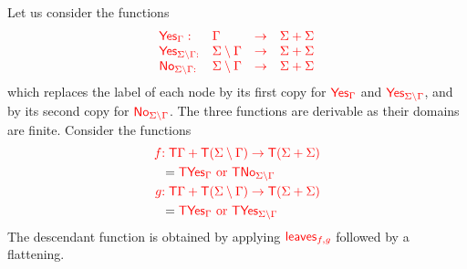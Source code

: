 \begin{example}
Let us consider the functions 
$$\begin{array}{llll}
\ranked{\mathsf{Yes}_\rGamma :} & \rGamma &\ranked{\to} &\ranked{ \rSigma+\rSigma}\\
 \ranked{\mathsf{Yes}_{\ranked{\rSigma\setminus\rGamma}:}}& \ranked{\rSigma\setminus\rGamma}&\ranked{\to} &\ranked{ \rSigma+\rSigma}\\
\ranked{\mathsf{No}_{\ranked{\rSigma\setminus\rGamma}: }}&\ranked{\rSigma\setminus\rGamma} &\ranked{\to}& \ranked{ \rSigma+\rSigma}
\end{array}$$
which replaces the label of each node by its first copy for $\ranked{\mathsf{Yes}_\Gamma}$ and $\ranked{\mathsf{Yes}_{\rSigma\setminus\rGamma}}$, and by its second copy for $\ranked{\mathsf{No}_{\rSigma\setminus\rGamma}}$. The three functions are derivable as their domains are finite. 
Consider the functions 
\begin{align*}
\ranked{f} &\ranked{: \tmonad\rGamma+\tmonad(\rSigma\setminus\rGamma) \to \tmonad (\rSigma+\rSigma)}\\
&=\ranked{ \tmonad\mathsf{Yes}_\rGamma \text{ or } \tmonad\mathsf{No}_{\rSigma\setminus \rGamma}}\\
\ranked{g} &\ranked{: \tmonad\rGamma+\tmonad(\rSigma\setminus\rGamma) \to \tmonad (\rSigma+\rSigma)}\\
&=\ranked{ \tmonad\mathsf{Yes}_\rGamma \text{ or } \tmonad\mathsf{Yes}_{\rSigma\setminus \rGamma}} 
\end{align*}
The descendant function is obtained by applying $\ranked{\mathsf{leaves}_{f,g}}$ followed by a flattening.


\end{example}
